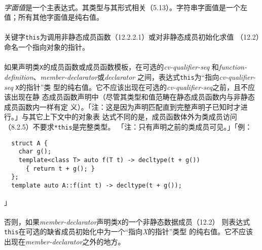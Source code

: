 
\paragraph{}
\textit{字面值}是一个主表达式。其类型与其形式相关（5.13）。字符串字面值是一个左
值；所有其他字面值是纯右值。

\paragraph{}
关键字\texttt{this}为调用非静态成员函数（12.2.2.1）或对非静态成员初始化求值
（12.2）命名一个指向对象的指针。

\paragraph{}
如果声明类\texttt{X}的成员函数或成员函数模板，在可选的\textit{cv-qualifier-seq}
和\textit{function-definition}、\textit{member-declarator}或\textit{declarator}
之间，表达式\texttt{this}为``指向\textit{cv-qualifier-seq} \texttt{X}的指针''类
型的纯右值。它不应该出现在可选的\textit{cv-qualifier-seq}之前，且不应该出现在静
态成员函数声明中（尽管其类型和值范畴在静态成员函数内与非静态成员函数内一样有定
义）。「注：这是因为声明匹配直到完整声明子已知时才进行。」与其它上下文中的对象表
达式不同的是，成员函数体外为类成员访问（8.2.5）不要求\texttt{*this}是完整类型。
「注：只有声明之前的类成员可见。」「例：
\begin{lstlisting}
  struct A {
    char g();
    template<class T> auto f(T t) -> decltype(t + g())
      { return t + g(); }
  };
  template auto A::f(int t) -> decltype(t + g());
\end{lstlisting}」

\paragraph{}
否则，如果\textit{member-declarator}声明类\texttt{X}的一个非静态数据成员（12.2）
则表达式\texttt{this}在可选的缺省成员初始化中为一个``指向\textit{X}的指针''类型
的纯右值。它不应该出现在\textit{member-declarator}之外的地方。

